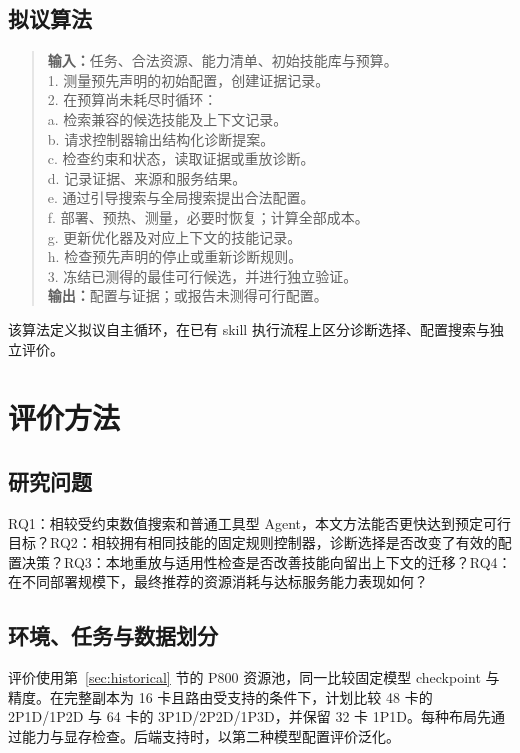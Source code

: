 \documentclass[UTF8,11pt,a4paper,fontset=windows]{ctexart}
\begin{document}
\subsection{拟议算法}
\begin{quote}\small
\textbf{输入：}任务、合法资源、能力清单、初始技能库与预算。\\
1. 测量预先声明的初始配置，创建证据记录。\\
2. 在预算尚未耗尽时循环：\\
\hspace*{1em}a. 检索兼容的候选技能及上下文记录。\\
\hspace*{1em}b. 请求控制器输出结构化诊断提案。\\
\hspace*{1em}c. 检查约束和状态，读取证据或重放诊断。\\
\hspace*{1em}d. 记录证据、来源和服务结果。\\
\hspace*{1em}e. 通过引导搜索与全局搜索提出合法配置。\\
\hspace*{1em}f. 部署、预热、测量，必要时恢复；计算全部成本。\\
\hspace*{1em}g. 更新优化器及对应上下文的技能记录。\\
\hspace*{1em}h. 检查预先声明的停止或重新诊断规则。\\
3. 冻结已测得的最佳可行候选，并进行独立验证。\\
\textbf{输出：}配置与证据；或报告未测得可行配置。
\end{quote}
该算法定义拟议自主循环，在已有 skill 执行流程上区分诊断选择、配置搜索与独立评价。

\section{评价方法}
\subsection{研究问题}
RQ1：相较受约束数值搜索和普通工具型 Agent，本文方法能否更快达到预定可行目标？RQ2：相较拥有相同技能的固定规则控制器，诊断选择是否改变了有效的配置决策？RQ3：本地重放与适用性检查是否改善技能向留出上下文的迁移？RQ4：在不同部署规模下，最终推荐的资源消耗与达标服务能力表现如何？

\subsection{环境、任务与数据划分}
评价使用第~\ref{sec:historical} 节的 P800 资源池，同一比较固定模型 checkpoint 与精度。在完整副本为 16 卡且路由受支持的条件下，计划比较 48 卡的 2P1D/1P2D 与 64 卡的 3P1D/2P2D/1P3D，并保留 32 卡 1P1D。每种布局先通过能力与显存检查。后端支持时，以第二种模型配置评价泛化。
\end{document}
